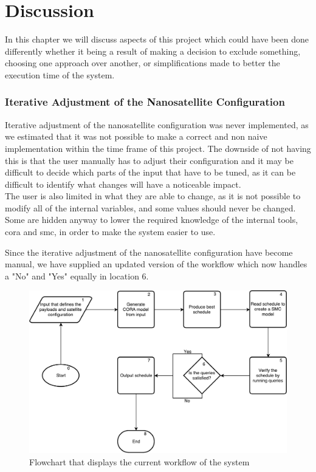 \chapter{Discussion} \label{sec:discussion}
In this chapter we will discuss aspects of this project which could have been done differently whether it being a result of making a decision to exclude something, choosing one approach over another, or simplifications made to better the execution time of the system.

\subsection*{Iterative Adjustment of the Nanosatellite Configuration} \label{subsec:disc_itt}
Iterative adjustment of the nanosatellite configuration was never implemented, as we estimated that it was not possible to make a correct and non naive implementation within the time frame of this project.
The downside of not having this is that the user manually has to adjust their configuration and it may be difficult to decide which parts of the input that have to be tuned, as it can be difficult to identify what changes will have a noticeable impact. \\
The user is also limited in what they are able to change, as it is not possible to modify all of the internal variables, and some values should never be changed. Some are hidden anyway to lower the required knowledge of the internal tools, \gls{cora} and \gls{smc}, in order to make the system easier to use. 

Since the iterative adjustment of the nanosatellite configuration have become manual, we have supplied an updated version of the workflow which now handles a "No" and "Yes" equally in location 6.
\begin{figure}[h]
	\includegraphics[width=\textwidth]{graphics/flow_act.pdf}
	\caption{Flowchart that displays the current workflow of the system}
	\label{fig:tool_act}
\end{figure}

